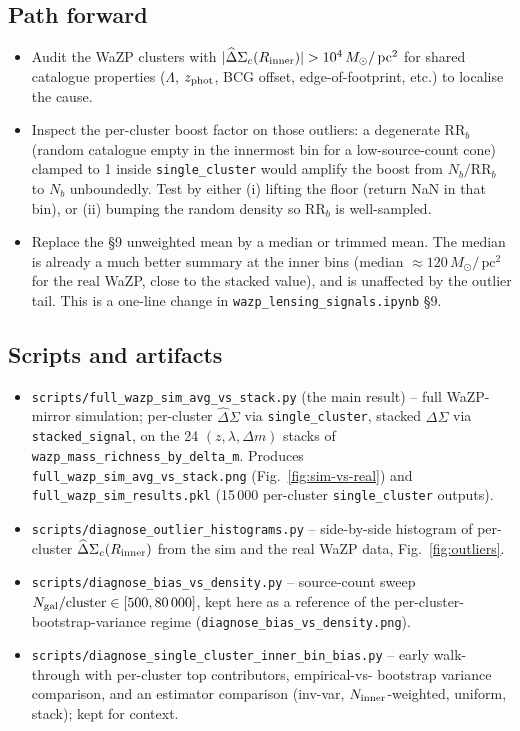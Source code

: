 \documentclass[11pt,a4paper]{article}
\newcommand{\DS}{\Delta\Sigma}
\newcommand{\Msun}{M_{\odot}}
\newcommand{\pc}{\,\mathrm{pc}}
\begin{document}
\subsection{Path forward}

\begin{itemize}
\item Audit the WaZP clusters with $|\widehat\DS_c(R_{\rm inner})|
      > 10^{4}\,\Msun/\pc^{2}$ for shared catalogue properties
      ($\Lambda$, $z_{\rm phot}$, BCG offset, edge-of-footprint, etc.)
      to localise the cause.
\item Inspect the per-cluster boost factor on those outliers: a
      degenerate $\mathrm{RR}_b$ (random catalogue empty in the
      innermost bin for a low-source-count cone) clamped to 1 inside
      \verb|single_cluster| would amplify the boost from
      $N_b / \mathrm{RR}_b$ to $N_b$ unboundedly.  Test by
      either (i) lifting the floor (return NaN in that bin), or (ii)
      bumping the random density so $\mathrm{RR}_b$ is well-sampled.
\item Replace the §9 unweighted mean by a median or trimmed mean.
      The median is already a much better summary at the inner bins
      (median $\approx 120\,\Msun/\pc^{2}$ for the real WaZP, close to
      the stacked value), and is unaffected by the outlier tail.
      This is a one-line change in
      \verb|wazp_lensing_signals.ipynb| §9.
\end{itemize}

\subsection{Scripts and artifacts}

\begin{itemize}
\item \verb|scripts/full_wazp_sim_avg_vs_stack.py| (the main result) --
      full WaZP-mirror simulation; per-cluster $\widehat\DS$ via
      \texttt{single\_cluster}, stacked $\DS$ via
      \texttt{stacked\_signal}, on the 24 $(z, \lambda, \Delta m)$
      stacks of \texttt{wazp\_mass\_richness\_by\_delta\_m}.  Produces
      \verb|full_wazp_sim_avg_vs_stack.png| (Fig.~\ref{fig:sim-vs-real})
      and \verb|full_wazp_sim_results.pkl| (15\,000 per-cluster
      \texttt{single\_cluster} outputs).
\item \verb|scripts/diagnose_outlier_histograms.py| -- side-by-side
      histogram of per-cluster $\widehat\DS_c(R_{\rm inner})$ from the
      sim and the real WaZP data, Fig.~\ref{fig:outliers}.
\item \verb|scripts/diagnose_bias_vs_density.py| -- source-count sweep
      $N_{\rm gal}/\mathrm{cluster} \in [500, 80\,000]$, kept here as
      a reference of the per-cluster-bootstrap-variance regime
      (\verb|diagnose_bias_vs_density.png|).
\item \verb|scripts/diagnose_single_cluster_inner_bin_bias.py| -- early
      walk-through with per-cluster top contributors, empirical-vs-
      bootstrap variance comparison, and an estimator comparison
      (inv-var, $N_{\rm inner}$-weighted, uniform, stack); kept for
      context.
\end{itemize}
\end{document}
